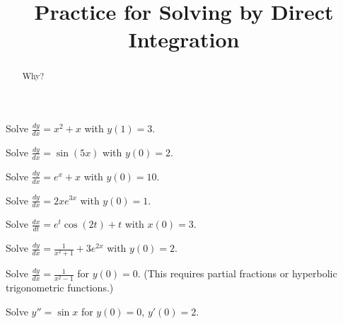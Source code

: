\documentclass{ximera}
\title{Practice for Solving by Direct Integration}
\begin{document}
\begin{abstract}
    Why?
\end{abstract}
\maketitle


\begin{exercise}
    Solve $\frac{dy}{dx} = x^2+x$ with $y(1)=3$.
\end{exercise}

\begin{exercise}
    Solve $\frac{dy}{dx} = \sin (5x)$ with $y(0)=2$.
\end{exercise}

\begin{exercise}%
    Solve $\frac{dy}{dx} = e^x + x$ with $y(0) = 10$.
\end{exercise}

\begin{exercise}
    Solve $\frac{dy}{dx} = 2xe^{3x}$ with $y(0) = 1$. 
\end{exercise}

\begin{exercise}
    Solve $\frac{dx}{dt} = e^t\cos(2t) + t$ with $x(0) = 3$. 
\end{exercise}

\begin{exercise}
    Solve $\frac{dy}{dx} = \frac{1}{x^2 + 1} + 3e^{2x}$ with $y(0) =2$. 
\end{exercise}

\begin{exercise}
    Solve $\frac{dy}{dx} = \frac{1}{x^2-1}$ for $y(0)=0$. (This requires partial fractions or hyperbolic trigonometric functions.)
\end{exercise}

\begin{exercise}[harder]
    Solve $y'' = \sin x$ for $y(0)=0$, $y'(0) = 2$.
\end{exercise}
\end{document}
